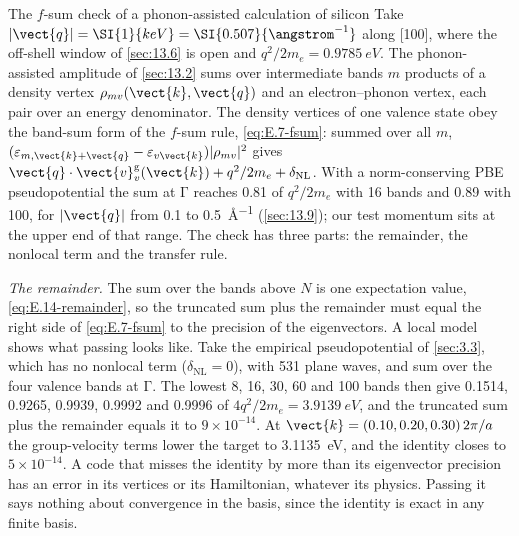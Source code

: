 \begin{workedexample}{The $f$-sum check of a phonon-assisted calculation of silicon}\label{we:22-fsum}
Take $|\vect{q}| = \SI{1}{keV} = \SI{0.507}{\angstrom^{-1}}$ along [100], where the off-shell window of \cref{sec:13.6} is open and $q^2/2m_e = \SI{0.9785}{eV}$. The phonon-assisted amplitude of \cref{sec:13.2} sums over intermediate bands $m$ products of a density vertex $\rho_{mv}(\vect{k},\vect{q})$ and an electron--phonon vertex, each pair over an energy denominator. The density vertices of one valence state obey the band-sum form of the $f$-sum rule, \cref{eq:E.7-fsum}: summed over all $m$, $(\varepsilon_{m,\vect{k}+\vect{q}} - \varepsilon_{v\vect{k}})|\rho_{mv}|^2$ gives $\vect{q}\cdot\vect{v}^{\mathrm{g}}_v(\vect{k}) + q^2/2m_e + \delta_{\mathrm{NL}}$. With a norm-conserving PBE pseudopotential the sum at $\mathrm{\Gamma}$ reaches 0.81 of $q^2/2m_e$ with 16 bands and 0.89 with 100, for $|\vect{q}|$ from 0.1 to \SI{0.5}{\angstrom^{-1}} (\cref{sec:13.9}); our test momentum sits at the upper end of that range. The check has three parts: the remainder, the nonlocal term and the transfer rule.

\emph{The remainder.} The sum over the bands above $N$ is one expectation value, \cref{eq:E.14-remainder}, so the truncated sum plus the remainder must equal the right side of \cref{eq:E.7-fsum} to the precision of the eigenvectors. A local model shows what passing looks like. Take the empirical pseudopotential of \cref{sec:3.3}, which has no nonlocal term ($\delta_{\mathrm{NL}} = 0$), with 531 plane waves, and sum over the four valence bands at $\mathrm{\Gamma}$. The lowest 8, 16, 30, 60 and 100 bands then give 0.1514, 0.9265, 0.9939, 0.9992 and 0.9996 of $4q^2/2m_e = \SI{3.9139}{eV}$, and the truncated sum plus the remainder equals it to $9\times10^{-14}$. At $\vect{k} = (0.10, 0.20, 0.30)\,2\pi/a$ the group-velocity terms lower the target to \SI{3.1135}{eV}, and the identity closes to $5\times10^{-14}$. A code that misses the identity by more than its eigenvector precision has an error in its vertices or its Hamiltonian, whatever its physics. Passing it says nothing about convergence in the basis, since the identity is exact in any finite basis.


\end{workedexample}

